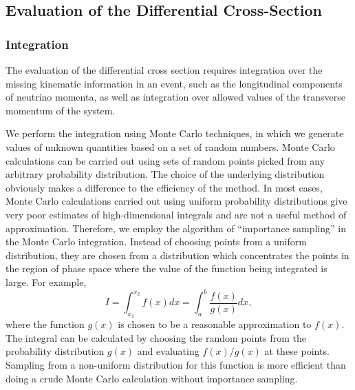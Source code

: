 \documentclass{cmspaper}
\begin{document}
\subsection{Evaluation of the Differential Cross-Section}

\subsubsection{Integration}
The evaluation of the differential cross section requires integration over the missing kinematic information in an event, such 
as the longitudinal components of neutrino momenta, as well as integration over allowed values of the transverse momentum
of the system.

We perform the integration using Monte Carlo techniques, in which we generate values of unknown quantities based on a set of
random numbers.  Monte Carlo calculations can be carried out using sets of random points picked from any arbitrary probability 
distribution. The choice of the underlying distribution obviously makes a difference to the efficiency of the method. In most cases,
Monte Carlo calculations carried out using uniform probability distributions give very poor estimates of high-dimensional integrals
and are not a useful method of approximation. 
Therefore, we employ the algorithm of ``importance sampling'' in the Monte Carlo integration. Instead of choosing points from a 
uniform distribution, they are chosen from a distribution which concentrates the points in the region of phase space where the 
value of the function being integrated is large.  For example,
\begin{equation}
\label{eqn:ImpSampling}
I=\int_{x_{1}}^{x_{2}} f(x)dx = \int_{a}^{b} \frac{f(x)}{g(x)}dx,
\end{equation}
where the function $g(x)$ is chosen to be a reasonable approximation to $f(x)$. The integral can be calculated by choosing the random points 
from the probability distribution $g(x)$ and evaluating $f(x)/g(x)$ at these points.  Sampling from a non-uniform distribution for this function 
is more efficient than doing a crude Monte Carlo calculation without importance sampling.
\end{document}
